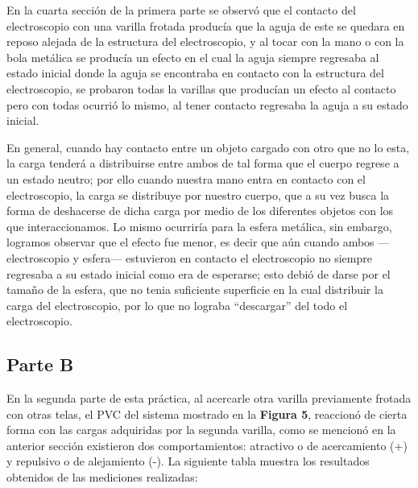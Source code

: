\documentclass[letterpaper, 11 pt]{article}
\begin{document}
\begin{multicols*}{2}
En la cuarta sección de la primera parte se observó que el contacto del electroscopio con una varilla frotada producía que la aguja de este se quedara en reposo alejada de la estructura del electroscopio, y al tocar con la mano o con la bola metálica se producía un efecto en el cual la aguja siempre regresaba al estado inicial donde la aguja se encontraba en contacto con la estructura del electroscopio, se probaron todas la varillas que producían un efecto al contacto pero con todas ocurrió lo mismo, al tener contacto regresaba la aguja a su estado inicial.

En general, cuando hay contacto entre un objeto cargado con otro que no lo esta, la carga tenderá a distribuirse entre ambos de tal forma que el cuerpo regrese a un estado neutro; por ello cuando nuestra mano entra en contacto con el electroscopio, la carga se distribuye por nuestro cuerpo, que a su vez busca la forma de deshacerse de dicha carga por medio de los diferentes objetos con los que interaccionamos. Lo mismo ocurriría para la esfera metálica, sin embargo, logramos observar que el efecto fue menor, es decir que aún cuando ambos —electroscopio y esfera— estuvieron en contacto el electroscopio no siempre regresaba a su estado inicial como era de esperarse; esto debió de darse por el tamaño de la esfera, que no tenia suficiente superficie en la cual distribuir la carga del electroscopio, por lo que no lograba “descargar” del todo el electroscopio.

\subsection*{Parte B }

En la segunda parte de esta práctica, al acercarle otra varilla previamente frotada con otras telas, el PVC del sistema mostrado en la \textbf{Figura 5}, reaccionó de cierta forma con las cargas adquiridas por la segunda varilla, como se mencionó en la anterior sección existieron dos comportamientos: atractivo o de acercamiento (+) y repulsivo o de alejamiento (-). La siguiente tabla muestra los resultados obtenidos de las mediciones realizadas:

\begin{table}[H]
\begin{center}
    \caption{Signo de la carga en función del comportamiento del PVC.}
\end{center}    
\end{table}


\end{multicols*}
\end{document}
